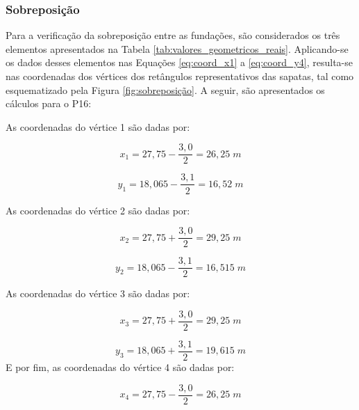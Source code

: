 \subsubsection{Sobreposição}
\label{subsec:sobreposicao_s16}

Para a verificação da sobreposição entre as fundações, são considerados os três elementos apresentados na Tabela \ref{tab:valores_geometricos_reais}. Aplicando-se os dados desses elementos nas Equações \eqref{eq:coord_x1} a \eqref{eq:coord_y4}, resulta-se nas coordenadas dos vértices dos retângulos representativos das sapatas, tal como esquematizado pela Figura \ref{fig:sobreposição}. A seguir, são apresentados os cálculos para o P16:

As coordenadas do vértice 1 são dadas por:

\begin{equation}
x_{1}= 27,75 - \frac{3,0}{2} = 26,25 \; m
    \label{eq:EL16_coord_x1}
\end{equation}

\begin{equation}
y_{1}= 18,065 - \frac{3,1}{2} =16,52 \; m
    \label{eq:EL16_coord_y1}
\end{equation}

As coordenadas do vértice 2 são dadas por:

\begin{equation}
x_{2}= 27,75 + \frac{3,0}{2} = 29,25 \; m
    \label{eq:EL16_coord_x2}
\end{equation}

\begin{equation}
y_{2}= 18,065 - \frac{3,1}{2} = 16,515 \; m
    \label{eq:EL16_coord_y2}
\end{equation}

As coordenadas do vértice 3 são dadas por:

\begin{equation}
x_{3}= 27,75 + \frac{3,0}{2} = 29,25 \; m
    \label{eq:EL16_coord_x3}
\end{equation}

\begin{equation}
y_{3}= 18,065 + \frac{3,1}{2} = 19,615 \; m
    \label{eq:EL16_coord_y3}
\end{equation}
 E por fim, as coordenadas do vértice 4 são dadas por:
 
\begin{equation}
x_{4}= 27,75 - \frac{3,0}{2} = 26,25 \; m
    \label{eq:EL16_coord_x4}
\end{equation}

